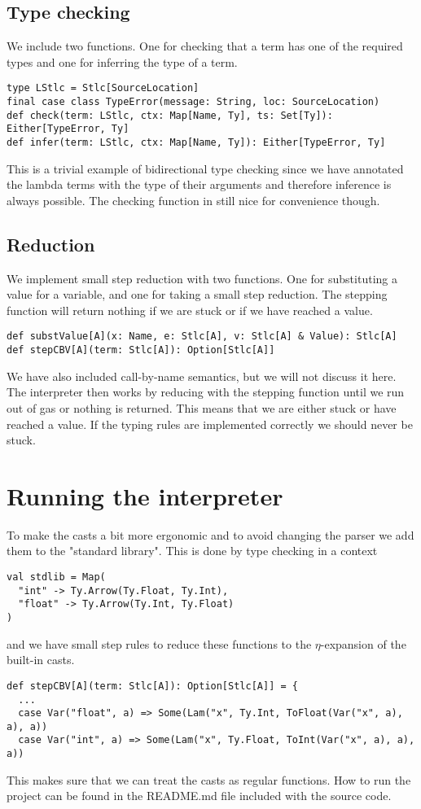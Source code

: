 \documentclass[11pt]{article}
\begin{document}
\subsection{Type checking}
We include two functions. One for checking that a term has one of the required types and one for inferring the type of a term.
\begin{lstlisting}
type LStlc = Stlc[SourceLocation]
final case class TypeError(message: String, loc: SourceLocation)
def check(term: LStlc, ctx: Map[Name, Ty], ts: Set[Ty]): Either[TypeError, Ty]
def infer(term: LStlc, ctx: Map[Name, Ty]): Either[TypeError, Ty]
\end{lstlisting}
This is a trivial example of bidirectional type checking since we have annotated the lambda terms with the type of their arguments and therefore inference is always possible. The checking function in still nice for convenience though.
\subsection{Reduction}
We implement small step reduction with two functions. One for substituting a value for a variable, and one for taking a small step reduction. The stepping function will return nothing if we are stuck or if we have reached a value.
\begin{lstlisting}
def substValue[A](x: Name, e: Stlc[A], v: Stlc[A] & Value): Stlc[A]
def stepCBV[A](term: Stlc[A]): Option[Stlc[A]]
\end{lstlisting}
We have also included call-by-name semantics, but we will not discuss it here. The interpreter then works by reducing with the stepping function until we run out of gas or nothing is returned. This means that we are either stuck or have reached a value. If the typing rules are implemented correctly we should never be stuck.
\section{Running the interpreter}
To make the casts a bit more ergonomic and to avoid changing the parser we add them to the "standard library". This is done by type checking in a context
\begin{lstlisting}
val stdlib = Map(
  "int" -> Ty.Arrow(Ty.Float, Ty.Int),
  "float" -> Ty.Arrow(Ty.Int, Ty.Float)
)
\end{lstlisting}
and we have small step rules to reduce these functions to the $\eta$-expansion of the built-in casts.
\begin{lstlisting}
def stepCBV[A](term: Stlc[A]): Option[Stlc[A]] = {
  ...
  case Var("float", a) => Some(Lam("x", Ty.Int, ToFloat(Var("x", a), a), a))
  case Var("int", a) => Some(Lam("x", Ty.Float, ToInt(Var("x", a), a), a))
\end{lstlisting}
This makes sure that we can treat the casts as regular functions. How to run the project can be found in the README.md file included with the source code.
\end{document}
